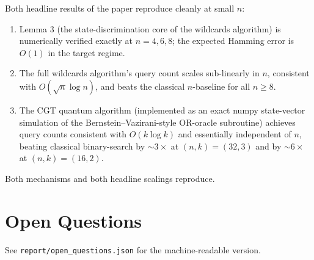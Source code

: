 \documentclass[11pt]{article}
\begin{document}
Both headline results of the paper reproduce cleanly at small $n$:
\begin{enumerate}
  \item Lemma 3 (the state-discrimination core of the wildcards
  algorithm) is numerically verified exactly at $n=4,6,8$; the
  expected Hamming error is $O(1)$ in the target regime.
  \item The full wildcards algorithm's query count scales sub-linearly
  in $n$, consistent with $O(\sqrt n\log n)$, and beats the classical
  $n$-baseline for all $n\ge 8$.
  \item The CGT quantum algorithm (implemented as an exact numpy state-vector
  simulation of the Bernstein--Vazirani-style OR-oracle subroutine)
  achieves query counts consistent with $O(k\log k)$ and essentially
  independent of $n$, beating classical binary-search by $\sim 3\times$
  at $(n,k)=(32,3)$ and by $\sim 6\times$ at $(n,k)=(16,2)$.
\end{enumerate}

Both mechanisms and both headline scalings reproduce.

\section*{Open Questions}
See \texttt{report/open\_questions.json} for the machine-readable version.
\end{document}
